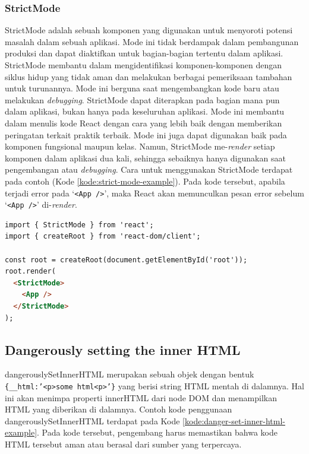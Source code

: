 \subsubsection{StrictMode}
StrictMode adalah sebuah komponen yang digunakan untuk menyoroti potensi masalah dalam sebuah aplikasi. Mode ini tidak berdampak dalam pembangunan produksi dan dapat diaktifkan untuk bagian-bagian tertentu dalam aplikasi. StrictMode membantu dalam mengidentifikasi komponen-komponen dengan siklus hidup yang tidak aman dan melakukan berbagai pemeriksaan tambahan untuk turunannya. Mode ini berguna saat mengembangkan kode baru atau melakukan \textit{debugging}. StrictMode dapat diterapkan pada bagian mana pun dalam aplikasi, bukan hanya pada keseluruhan aplikasi. Mode ini membantu dalam menulis kode React dengan cara yang lebih baik dengan memberikan peringatan terkait praktik terbaik. Mode ini juga dapat digunakan baik pada komponen fungsional maupun kelas. Namun, StrictMode me-\textit{render} setiap komponen dalam aplikasi dua kali, sehingga sebaiknya hanya digunakan saat pengembangan atau \textit{debugging}. Cara untuk menggunakan StrictMode terdapat pada contoh (Kode \ref{kode:strict-mode-example}). Pada kode tersebut, apabila terjadi error pada `\texttt{<App />}', maka React akan memunculkan pesan error sebelum `\texttt{<App />}' di-\textit{render}.

\begin{lstlisting}[language=HTML, caption=Contoh Potongan Kode StrictMode, label=kode:strict-mode-example]
import { StrictMode } from 'react';
import { createRoot } from 'react-dom/client';

const root = createRoot(document.getElementById('root'));
root.render(
  <StrictMode>
    <App />
  </StrictMode>
);
\end{lstlisting}

\subsection{Dangerously setting the inner HTML}
dangerouslySetInnerHTML merupakan sebuah objek dengan bentuk \texttt{\{\_\_html:'<p>some html<\/p>'\}} yang berisi string HTML mentah di dalamnya. Hal ini akan menimpa properti innerHTML dari node DOM dan menampilkan HTML yang diberikan di dalamnya. Contoh kode penggunaan dangerouslySetInnerHTML terdapat pada Kode \ref{kode:danger-set-inner-html-example}. Pada kode tersebut, pengembang harus memastikan bahwa kode HTML tersebut aman atau berasal dari sumber yang terpercaya. 

